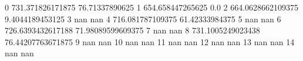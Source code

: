 0 731.371826171875 76.71337890625
1 654.658447265625 0.0
2 664.0628662109375 9.4044189453125
3 nan nan
4 716.081787109375 61.42333984375
5 nan nan
6 726.6393432617188 71.98089599609375
7 nan nan
8 731.1005249023438 76.44207763671875
9 nan nan
10 nan nan
11 nan nan
12 nan nan
13 nan nan
14 nan nan
